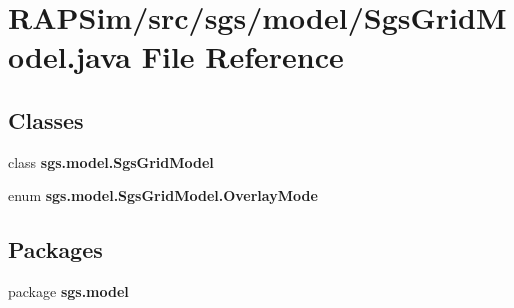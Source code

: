 \section{R\-A\-P\-Sim/src/sgs/model/\-Sgs\-Grid\-Model.java File Reference}
\label{_sgs_grid_model_8java}
\subsection*{Classes}
\begin{DoxyCompactItemize}
\item 
class {\bf sgs.\-model.\-Sgs\-Grid\-Model}
\item 
enum {\bf sgs.\-model.\-Sgs\-Grid\-Model.\-Overlay\-Mode}
\end{DoxyCompactItemize}
\subsection*{Packages}
\begin{DoxyCompactItemize}
\item 
package {\bf sgs.\-model}
\end{DoxyCompactItemize}
